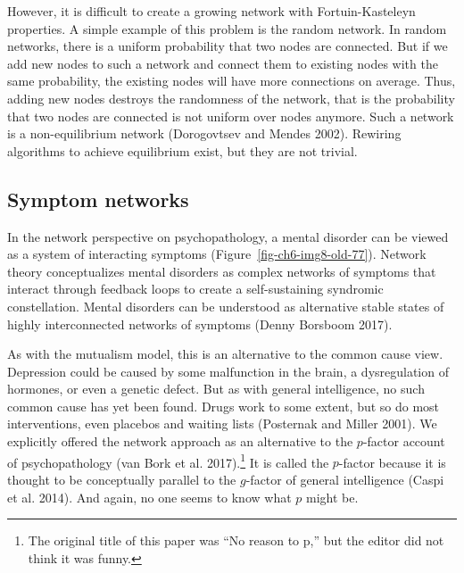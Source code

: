 \documentclass[
  a4paper,
  DIV=11,
  numbers=noendperiod,
  oneside]{scrreprt}
\begin{document}
However, it is difficult to create a growing network with
Fortuin-Kasteleyn properties. A simple example of this problem is the
random network. In random networks, there is a uniform probability that
two nodes are connected. But if we add new nodes to such a network and
connect them to existing nodes with the same probability, the existing
nodes will have more connections on average. Thus, adding new nodes
destroys the randomness of the network, that is the probability that two
nodes are connected is not uniform over nodes anymore. Such a network is
a non-equilibrium network (Dorogovtsev and Mendes 2002). Rewiring
algorithms to achieve equilibrium exist, but they are not trivial.

\hypertarget{symptom-networks}{%
\subsection{Symptom networks}\label{symptom-networks}}

In the network perspective on psychopathology, a mental disorder can be
viewed as a system of interacting symptoms
(Figure~\ref{fig-ch6-img8-old-77}). Network theory conceptualizes mental
disorders as complex networks of symptoms that interact through feedback
loops to create a self-sustaining syndromic constellation. Mental
disorders can be understood as alternative stable states of highly
interconnected networks of symptoms (Denny Borsboom 2017).

As with the mutualism model, this is an alternative to the common cause
view. Depression could be caused by some malfunction in the brain, a
dysregulation of hormones, or even a genetic defect. But as with general
intelligence, no such common cause has yet been found. Drugs work to
some extent, but so do most interventions, even placebos and waiting
lists (Posternak and Miller 2001). We explicitly offered the network
approach as an alternative to the \(p\)-factor account of
psychopathology (van Bork et al. 2017).\footnote{The original title of
  this paper was ``No reason to p,'' but the editor did not think it was
  funny.} It is called the \(p\)-factor because it is thought to be
conceptually parallel to the \(g\)-factor of general intelligence (Caspi
et al. 2014). And again, no one seems to know what \(p\) might be.
\end{document}
